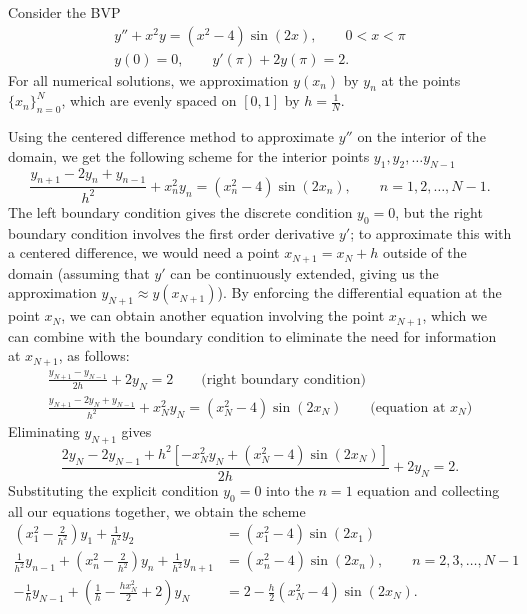 \documentclass{homework}
\begin{document}
	\question Consider the BVP
	\begin{gather*}
		y'' + x^2y = (x^2-4)\sin(2x), \qquad 0 < x < \pi \\
		y(0) = 0, \qquad y'(\pi) + 2y(\pi) = 2.
	\end{gather*}
	For all numerical solutions, we approximation $y(x_n)$ by $y_n$ at the points $\{x_n\}_{n=0}^N$, which are evenly spaced on $[0,1]$ by $h = \frac{1}{N}$.
	\begin{alphaparts}
		\questionpart Using the centered difference method to approximate $y''$ on the interior of the domain, we get the following scheme for the interior points $y_1, y_2, \dots y_{N-1}$
		\begin{equation*}
			\frac{y_{n+1} - 2y_n + y_{n-1}}{h^2} + x_n^2y_n = (x_n^2- 4)\sin(2x_n), \qquad n = 1, 2, \dots, N-1.
		\end{equation*}
		The left boundary condition gives the discrete condition $y_0 = 0$, but the right boundary condition involves the first order derivative $y'$; to approximate this with a centered difference, we would need a point $x_{N+1} = x_N + h$ outside of the domain (assuming that $y'$ can be continuously extended, giving us the approximation $y_{N+1} \approx y(x_{N+1})$). By enforcing the differential equation at the point $x_N$, we can obtain another equation involving the point $x_{N+1}$, which we can combine with the boundary condition to eliminate the need for information at $x_{N+1}$, as follows:
		\begin{gather*}
			\frac{y_{N+1}-y_{N-1}}{2h} + 2y_N = 2 \qquad \text{(right boundary condition)}\\
			\frac{y_{N+1} - 2y_N + y_{N-1}}{h^2} + x_N^2y_N = (x_N^2-4)\sin(2x_N) \qquad \text{(equation at $x_N$)}
		\end{gather*}
		Eliminating $y_{N+1}$ gives
		\begin{equation*}
			\frac{2y_{N} -2y_{N-1} +h^2\left[-x_N^2y_N + (x_N^2 - 4)\sin(2x_N)\right]}{2h} + 2y_N = 2.
		\end{equation*}
		Substituting the explicit condition $y_0 = 0$ into the $n =1$ equation and collecting all our equations together, we obtain the scheme
		\begin{align*}
			\left(x_1^2 - \frac{2}{h^2}\right)y_1 + \frac{1}{h^2}y_2 &= (x_1^2-4)\sin(2x_1) \\
			\frac{1}{h^2}y_{n-1} + \left(x_n^2 - \frac{2}{h^2}\right)y_n + \frac{1}{h^2}y_{n+1} &= (x_n^2-4)\sin(2x_n), \qquad n = 2,3,\dots, N-1 \\
			 -\frac{1}{h}y_{N-1} + \left(\frac{1}{h} -\frac{hx_N^2}{2} + 2\right)y_N &= 2-\frac{h}{2}(x_N^2-4)\sin(2x_N).

\end{align*}
\end{alphaparts}
\end{document}

